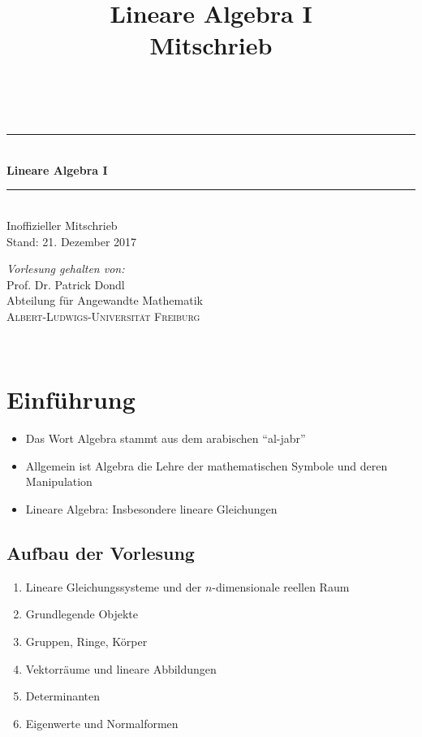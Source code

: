 \documentclass{report}
\title{Lineare Algebra I\\Mitschrieb}
\theoremstyle{customrem}
\theoremstyle{customdef}
\begin{document}
\begin{titlepage}
	\newcommand{\HRule}{\rule{\linewidth}{0.5mm}}
	\centering
	\vspace{6cm}
	\textsc{\large \thinspace}\\[0.5cm]
	\vspace{4cm}
	\HRule \\[0.8cm]
	{ \Huge  \textbf{Lineare Algebra $\mathbf{I}$}}\\[0.4cm] 
	\HRule \\[.5cm]
	{\Large Inoffizieller Mitschrieb}\\[1.0cm]
	Stand: 21. Dezember 2017
	\\[11.5cm]
	\begin{minipage}{0.65\textwidth}
		\begin{center} \large
			\textsl{Vorlesung gehalten von:}\\[1cm]
			Prof. Dr. Patrick Dondl\\
			Abteilung für Angewandte Mathematik\\
			\textsc{\large Albert-Ludwigs-Universität Freiburg}
		\end{center}
	\end{minipage}\\[2.5cm]
	\thispagestyle{empty}
\end{titlepage}


\section*{Einführung}
	\begin{itemize}
		\item Das Wort Algebra stammt aus dem arabischen "`al-jabr"'
		\item Allgemein ist Algebra die Lehre der mathematischen Symbole und deren Manipulation
		\item Lineare Algebra: Insbesondere lineare Gleichungen
	\end{itemize}

\subsection*{Aufbau der Vorlesung}
	\begin{enumerate}
		\item Lineare Gleichungssysteme und der $n$-dimensionale reellen Raum
		\item Grundlegende Objekte
		\item Gruppen, Ringe, Körper
		\item Vektorräume und lineare Abbildungen
		\item Determinanten
		\item Eigenwerte und Normalformen
	\end{enumerate}
\end{document}
